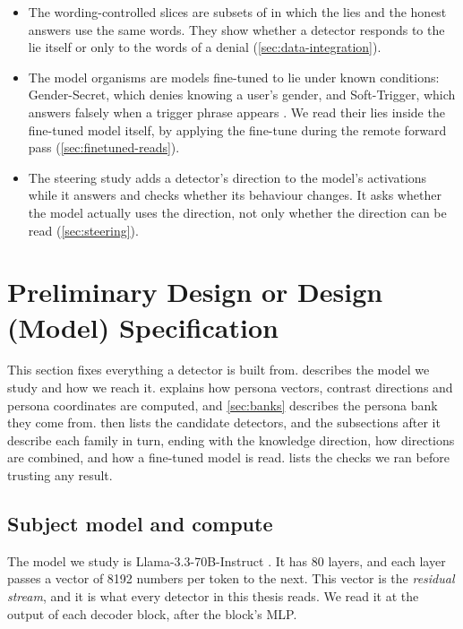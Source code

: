 \begin{itemize}[leftmargin=1.6em, itemsep=2pt]
\item The wording-controlled \hpkr{} slices are subsets of \hpkr{} in which the lies and the honest
  answers use the same words. They show whether a detector responds to the lie itself or only to the
  words of a denial (\cref{sec:data-integration}).
\item The model organisms are models fine-tuned to lie under known conditions: Gender-Secret, which
  denies knowing a user's gender, and Soft-Trigger, which answers falsely when a trigger phrase
  appears \cite{kretschmar2025liars}. We read their lies inside the fine-tuned model itself, by
  applying the fine-tune during the remote forward pass (\cref{sec:finetuned-reads}).
\item The steering study adds a detector's direction to the model's activations while it answers and
  checks whether its behaviour changes. It asks whether the model actually uses the direction, not
  only whether the direction can be read (\cref{sec:steering}).
\end{itemize}

\section{Preliminary Design or Design (Model) Specification}
\label{sec:alternatives}

This section fixes everything a detector is built from.  describes the model we
study and how we reach it.  explains how persona vectors, contrast directions
and persona coordinates are computed, and \cref{sec:banks} describes the persona bank they come from.
 then lists the candidate detectors, and the subsections after it describe
each family in turn, ending with the knowledge direction, how directions are combined, and how a
fine-tuned model is read.  lists the checks we ran before trusting any result.

\subsection{Subject model and compute}
\label{sec:model}

The model we study is Llama-3.3-70B-Instruct \cite{grattafiori2024llama}. It has 80 layers, and
each layer passes a vector of 8192 numbers per token to the next. This vector is the
\emph{residual stream}, and it is what every detector in this thesis reads.
We read it at the output of each decoder block, after the block's MLP.

